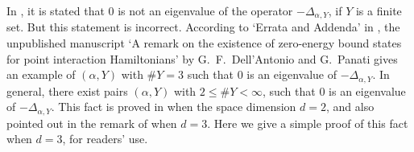 \documentclass[12pt,a4paper]{article}
\newtheorem{lemma}[theorem]{Lemma}
\begin{document}
%
%
%
%

In \cite[Theorem II.1.1.4]{Al-Ge-Ho-Ho},
it is stated that $0$ is not an eigenvalue of 
the operator $-\Delta_{\alpha,Y}$,
if $Y$ is a finite set.
But this statement is incorrect.
According to `Errata and Addenda' in \cite[page 485]{Al-Ge-Ho-Ho},
the unpublished manuscript
`A remark on the existence of zero-energy bound states for 
point interaction Hamiltonians' by G.\ F.\  Dell'Antonio and G.\ Panati
gives an example of $(\alpha,Y)$ with $\#Y=3$ such that
$0$ is an eigenvalue of $-\Delta_{\alpha,Y}$.
In general, there exist pairs $(\alpha,Y)$ with 
$2\leq \# Y<\infty$, such that
$0$ is an eigenvalue of $-\Delta_{\alpha,Y}$.
This fact is proved in \cite[Theorem 1.1]{Co-Mi-Ya} when 
the space dimension $d=2$,
and also pointed out in the remark of \cite[Theorem 1.1]{Co-Mi-Ya} when $d=3$.
Here we give a simple proof of this fact when $d=3$,
for readers' use.
\end{document}
